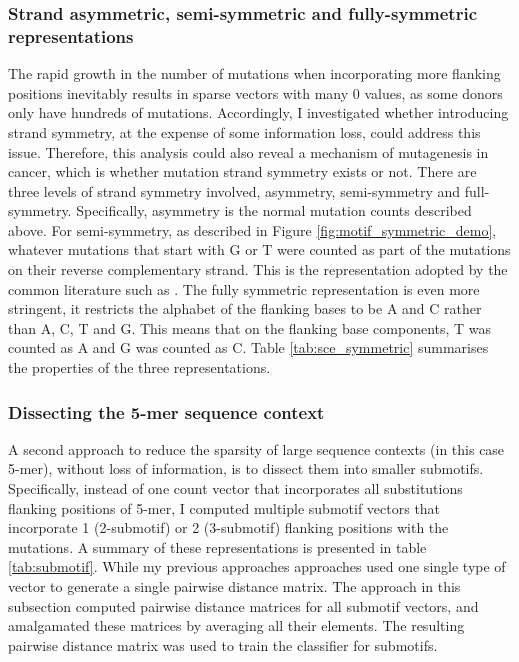 \subsubsection{Strand asymmetric, semi-symmetric and fully-symmetric representations}
The rapid growth in the number of mutations when incorporating more flanking positions inevitably results in sparse vectors with many 0 values, as some donors only have hundreds of mutations. Accordingly, I investigated whether introducing strand symmetry, at the expense of some information loss, could address this issue. Therefore, this analysis could also reveal a mechanism of mutagenesis in cancer, which is whether mutation strand symmetry exists or not. There are three levels of strand symmetry involved, asymmetry, semi-symmetry and full-symmetry. Specifically, asymmetry is the normal mutation counts described above. For semi-symmetry, as described in Figure \ref{fig:motif_symmetric_demo}, whatever mutations that start with G or T were counted as part of the mutations on their reverse complementary strand. This is the representation adopted by the common literature such as \citet{Jiao2020}. The fully symmetric representation is even more stringent, it restricts the alphabet of the flanking bases to be A and C rather than A, C, T and G. This means that on the flanking base components, T was counted as A and G was counted as C. Table \ref{tab:sce_symmetric} summarises the properties of the three representations.



\subsubsection{Dissecting the 5-mer sequence context}
A second approach to reduce the sparsity of large sequence contexts (in this case 5-mer), without loss of information, is to dissect them into smaller submotifs. Specifically, instead of one count vector that incorporates all substitutions flanking positions of 5-mer, I computed multiple submotif vectors that incorporate 1 (2-submotif) or 2 (3-submotif) flanking positions with the mutations. A summary of these representations is presented in table \ref{tab:submotif}. While my previous approaches approaches used one single type of vector to generate a single pairwise distance matrix. The approach in this subsection computed pairwise distance matrices for all submotif vectors, and amalgamated these matrices by averaging all their elements. The resulting pairwise distance matrix was used to train the classifier for submotifs. 

